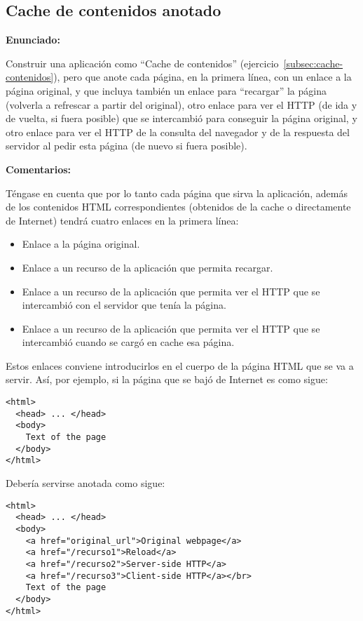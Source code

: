 \subsection{Cache de contenidos anotado}
\label{subsec:cache-contenidos-anotado}

\textbf{Enunciado:}

Construir una aplicación como ``Cache de contenidos'' (ejercicio~\ref{subsec:cache-contenidos}), pero que anote cada página, en la primera línea, con un enlace a la página original, y que incluya también un enlace para ``recargar'' la página (volverla a refrescar a partir del original), otro enlace para ver el HTTP (de ida y de vuelta, si fuera posible) que se intercambió para conseguir la página original, y otro enlace para ver el HTTP de la consulta del navegador y de la respuesta del servidor al pedir esta página (de nuevo si fuera posible).

\textbf{Comentarios:}

Téngase en cuenta que por lo tanto cada página que sirva la aplicación, además de los contenidos  HTML correspondientes (obtenidos de la cache o directamente de Internet) tendrá cuatro enlaces en la primera línea:

\begin{itemize}
\item Enlace a la página original.
\item Enlace a un recurso de la aplicación que permita recargar.
\item Enlace a un recurso de la aplicación que permita ver el HTTP que se intercambió con el servidor que tenía la página.
\item Enlace a un recurso de la aplicación que permita ver el HTTP que se intercambió cuando se cargó en cache esa página.
\end{itemize}

Estos enlaces conviene introducirlos en el cuerpo de la página HTML que se va a servir. Así, por ejemplo, si la página que se bajó de Internet es como sigue:

\begin{verbatim}
<html>
  <head> ... </head>
  <body>
    Text of the page
  </body>
</html>
\end{verbatim}

Debería servirse anotada como sigue:

\begin{verbatim}
<html>
  <head> ... </head>
  <body>
    <a href="original_url">Original webpage</a>
    <a href="/recurso1">Reload</a>
    <a href="/recurso2">Server-side HTTP</a>
    <a href="/recurso3">Client-side HTTP</a></br>
    Text of the page
  </body>
</html>
\end{verbatim}

